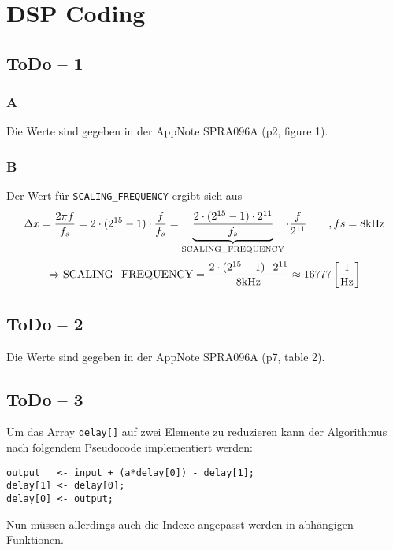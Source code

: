 \section{DSP Coding}

\subsection{ToDo -- 1}

\subsubsection{A}
Die Werte sind gegeben in der AppNote SPRA096A (p2, figure 1).

\subsubsection{B}
Der Wert für \lstinline{SCALING_FREQUENCY} ergibt sich aus
\[
	\Delta x = \frac{2 \pi f}{f_s} \\
	= 2 \cdot (2^{15} - 1 ) \cdot \frac{f}{f_s} \\
	= \underbrace{\frac{2 \cdot (2^{15} -1 )
		\cdot 2^{11}}{f_s}}_{\text{\lstinline{SCALING_FREQUENCY}}}
		\cdot \frac{f}{2^{11}} \qquad ,fs = 8\text{kHz}
\]
\[
	\Rightarrow \text{\lstinline{SCALING_FREQUENCY}} = 
	\frac{2 \cdot (2^{15} -1 ) \cdot 2^{11}}{8\text{kHz}}
		\approx 16777 \left[ \frac{1}{\text{Hz}} \right]
\]

\subsection{ToDo -- 2}
Die Werte sind gegeben in der AppNote SPRA096A (p7, table 2).

\newpage
\subsection{ToDo -- 3}
Um das Array \lstinline{delay[]} auf zwei Elemente zu reduzieren kann der
Algorithmus nach folgendem Pseudocode implementiert werden:

\begin{lstlisting}
output   <- input + (a*delay[0]) - delay[1];
delay[1] <- delay[0];
delay[0] <- output;
\end{lstlisting}




Nun müssen allerdings auch die Indexe angepasst werden in abhängigen Funktionen.


